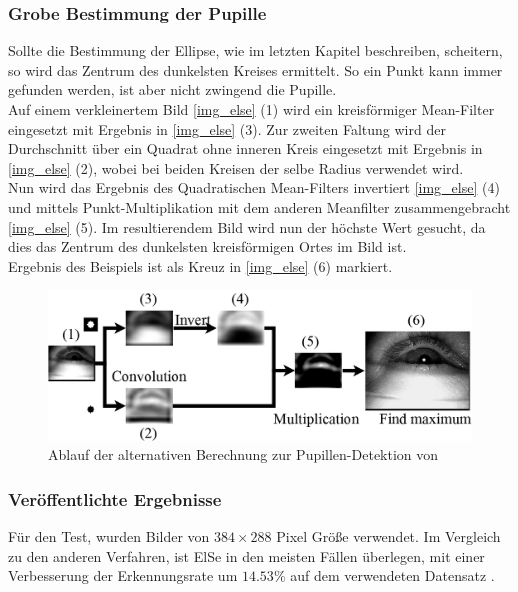\subsubsection{Grobe Bestimmung der Pupille}
\label{ElSe_Grob}
Sollte die Bestimmung der Ellipse, wie im letzten Kapitel beschreiben, scheitern, so wird das Zentrum des dunkelsten Kreises ermittelt. So ein Punkt kann immer gefunden werden, ist aber nicht zwingend die Pupille.\\
Auf einem verkleinertem Bild \autoref{img_else} (1) wird ein kreisförmiger Mean-Filter eingesetzt mit Ergebnis in \autoref{img_else} (3). Zur zweiten Faltung wird der Durchschnitt über ein Quadrat ohne inneren Kreis eingesetzt mit Ergebnis in \autoref{img_else} (2), wobei bei beiden Kreisen der selbe Radius verwendet wird.\\
Nun wird das Ergebnis des Quadratischen Mean-Filters invertiert \autoref{img_else} (4) und mittels Punkt-Multiplikation mit dem anderen Meanfilter zusammengebracht \autoref{img_else} (5). Im resultierendem Bild wird nun der höchste Wert gesucht, da dies das Zentrum des dunkelsten kreisförmigen Ortes im Bild ist.\\
Ergebnis des Beispiels ist als Kreuz in \autoref{img_else} (6) markiert. 
\begin{figure}
	\centering
	\includegraphics[width=0.8\linewidth]{img/ElSe}
	\caption{Ablauf der alternativen Berechnung zur Pupillen-Detektion von \cite{ElSe}}
	\label{img_else}
\end{figure}
\subsubsection{Veröffentlichte Ergebnisse}
Für den Test, wurden Bilder von $384\times 288$ Pixel Größe verwendet.
Im Vergleich zu den anderen Verfahren, ist ElSe in den meisten Fällen überlegen, mit einer Verbesserung der Erkennungsrate um $14.53\%$ auf dem verwendeten Datensatz \cite{ElSe}.
